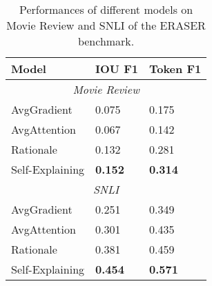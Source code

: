 \documentclass[11pt,a4paper]{article}
\begin{document}
\begin{comment}
\subsection{Evaluation on ERASER}
We also evaluate interpretability performances of different models on the ERASER dataset \citep{deyoung-etal-2020-eraser}. 
Evaluations are conducted on the 
Movie Review dataset and SNLI dataset in ERASER.  
Since the dataset is labeled in a way that an input can contain multiple rationales, we treat the threshold for $\alpha$ as the hyper-parameter to be tuned on the dev sets of ERASER.
Spans with $\alpha$ higher than the threshold will be selected. To deal with the issue of overlapping spans, we adopt the following strategy: we select spans in a top-down fashion, and the current span will be ignored if it overlaps with previously selected spans. 
We compared the extracted spans with the golden labeled spans and report  IOU F1 and token F1 scores. 
Results are shown in Table \ref{tab:eraser}. Performances on both the Movie Review and the SNLI datasets exhibit significant improvements of Self-Explaining over other baselines, demonstrating the stronger ability of extracting rationales of the proposed Self-Explaining method.
\end{comment}

\begin{table}[t]
  \centering
  \small
  \begin{tabular}{lll}
    \toprule
    {\bf Model} & {\bf IOU F1} & {\bf Token F1}\\
    \hline\hline 
    \multicolumn{3}{c}{\textit{Movie Review}}\\
    \midrule
    AvgGradient & 0.075 & 0.175 \\ 
    AvgAttention & 0.067 & 0.142  \\
    Rationale \citep{lei2016rationalizing} & 0.132  & 0.281 \\
    Self-Explaining & {\bf 0.152} & {\bf 0.314}  \\
    \hline\hline 
    \multicolumn{3}{c}{\textit{SNLI}}\\
    \midrule
    AvgGradient & 0.251& 0.349  \\ 
    AvgAttention & 0.301 &  0.435 \\
    Rationale \citep{lei2016rationalizing} & 0.381 & 0.459 \\
    Self-Explaining & {\bf 0.454} & {\bf 0.571}  \\
    \bottomrule
  \end{tabular}
  \caption{Performances of different models on Movie Review and SNLI of the ERASER benchmark.}
  \label{tab:eraser}
\end{table}
\end{document}
